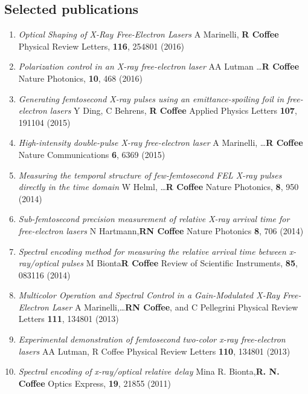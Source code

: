 
\subsection*{Selected publications}
\begin{enumerate}
\item \textit{Optical Shaping of X-Ray Free-Electron Lasers}
A Marinelli, \textbf{R Coffee}\etal
Physical Review Letters, \textbf{116}, 254801 (2016)
\item \textit{Polarization control in an X-ray free-electron laser}
AA Lutman \dots \textbf{R Coffee}\etal 
Nature Photonics, \textbf{10}, 468 (2016)
\item \textit{Generating femtosecond X-ray pulses using an emittance-spoiling foil in free-electron lasers}
Y Ding, C Behrens, \textbf{R Coffee}\etal
Applied Physics Letters \textbf{107}, 191104 (2015)
\item \textit{High-intensity double-pulse X-ray free-electron laser}
A Marinelli, \ldots \textbf{R Coffee}\etal
Nature Communications \textbf{6}, 6369 (2015)
\item \textit{Measuring the temporal structure of few-femtosecond FEL X-ray pulses directly in the time domain}
W Helml, \ldots \textbf{R Coffee}\etal
Nature Photonics, \textbf{8}, 950 (2014)
\item \textit{Sub-femtosecond precision measurement of relative X-ray arrival time for free-electron lasers}
N Hartmann,\etal \textbf{RN Coffee}
Nature Photonics \textbf{8}, 706 (2014)
\item \textit{Spectral encoding method for measuring the relative arrival time between x-ray/optical pulses}
M Bionta\etal \textbf{R Coffee}
Review of Scientific Instruments, \textbf{85}, 083116 (2014)
\item \textit{Multicolor Operation and Spectral Control in a Gain-Modulated X-Ray Free-Electron Laser}
A Marinelli,\etal\ldots \textbf{RN Coffee}, and C Pellegrini
Physical Review Letters \textbf{111}, 134801 (2013)
\item \textit{Experimental demonstration of femtosecond two-color x-ray free-electron lasers}
AA Lutman, R Coffee\etal
Physical Review Letters \textbf{110}, 134801 (2013)
\item \textit{Spectral encoding of x-ray/optical relative delay}
Mina R. Bionta,\etal \textbf{R. N. Coffee}
Optics Express, \textbf{19}, 21855 (2011)
\end{enumerate}


